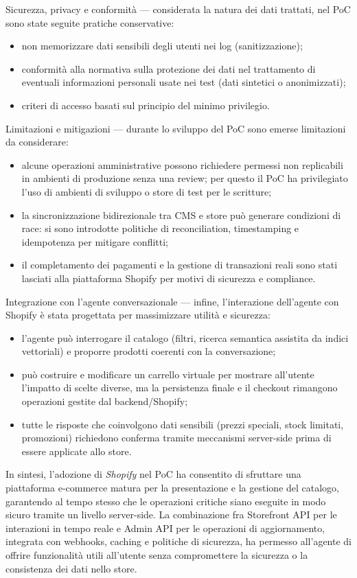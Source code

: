Sicurezza, privacy e conformità — considerata la natura dei dati trattati, nel PoC sono state seguite pratiche conservative:
\begin{itemize}
\item non memorizzare dati sensibili degli utenti nei log (sanitizzazione);
\item conformità alla normativa sulla protezione dei dati nel trattamento di eventuali informazioni personali usate nei test (dati sintetici o anonimizzati);
\item criteri di accesso basati sul principio del minimo privilegio.
\end{itemize}

Limitazioni e mitigazioni — durante lo sviluppo del PoC sono emerse limitazioni da considerare:
\begin{itemize}
\item alcune operazioni amministrative possono richiedere permessi non replicabili in ambienti di produzione senza una review; per questo il PoC ha privilegiato 
l'uso di ambienti di sviluppo o store di test per le scritture;
\item la sincronizzazione bidirezionale tra CMS e store può generare condizioni di race: si sono introdotte politiche di reconciliation, timestamping e idempotenza per mitigare conflitti;
\item il completamento dei pagamenti e la gestione di transazioni reali sono stati lasciati alla piattaforma Shopify per motivi di sicurezza e compliance.
\end{itemize}

Integrazione con l'agente conversazionale — infine, l'interazione dell'agente con Shopify è stata progettata per massimizzare utilità e sicurezza:
\begin{itemize}
\item l'agente può interrogare il catalogo (filtri, ricerca semantica assistita da indici vettoriali) e proporre prodotti coerenti con la conversazione;
\item può costruire e modificare un carrello virtuale per mostrare all'utente l'impatto di scelte diverse, ma la persistenza finale e il checkout rimangono operazioni gestite dal backend/Shopify;
\item tutte le risposte che coinvolgono dati sensibili (prezzi speciali, stock limitati, promozioni) richiedono conferma tramite meccanismi server-side prima di essere applicate allo store.
\end{itemize}

In sintesi, l'adozione di \emph{Shopify} nel PoC ha consentito di sfruttare una piattaforma e-commerce matura per la presentazione e la gestione del catalogo, garantendo al tempo 
stesso che le operazioni critiche siano eseguite in modo sicuro tramite un livello server-side. La combinazione fra Storefront API per le interazioni in tempo reale e Admin API 
per le operazioni di aggiornamento, integrata con webhooks, caching e politiche di sicurezza, ha permesso all'agente di offrire funzionalità utili all'utente senza compromettere 
la sicurezza o la consistenza dei dati nello store.


